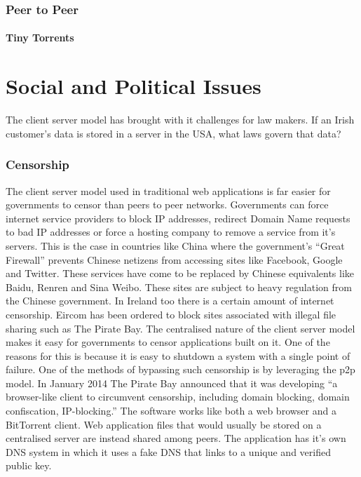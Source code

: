 \documentclass[11pt]{amsart}
\begin{document}
\section{Peer to Peer}
\subsection{Tiny Torrents}


\part{Social and Political Issues}

The client server model has brought with it challenges for law makers. If an Irish customer's data is stored in a server in the USA, what laws govern that data?

\section{Censorship}

The client server model used in traditional web applications is far easier for governments to censor than peers to peer networks. Governments can force internet service providers to block IP addresses, redirect Domain Name requests to bad IP addresses or force a hosting company to remove a service from it's servers. This is the case in countries like China where the government's ``Great Firewall'' prevents Chinese netizens from accessing sites like Facebook, Google and Twitter. These services have come to be replaced by Chinese equivalents like Baidu, Renren and Sina Weibo. These sites are subject to heavy regulation from the Chinese government. 
In Ireland too there is a certain amount of internet censorship. Eircom has been ordered to block sites associated with illegal file sharing such as The Pirate Bay.
The centralised nature of the client server model makes it easy for governments to censor applications built on it. One of the reasons for this is because it is easy to shutdown a system with a single point of failure.
One of the methods of bypassing such censorship is by leveraging the p2p model. In January 2014 The Pirate Bay announced that it was developing ``a browser-like client to circumvent censorship, including domain blocking, domain confiscation, IP-blocking.'' The software works like both a web browser and a BitTorrent client. Web application files that would usually be stored on a centralised server are instead shared among peers. The application has it's own DNS system in which it uses a fake DNS that links to a unique and verified public key.\cite{PirateBayBrowser}
\end{document}
